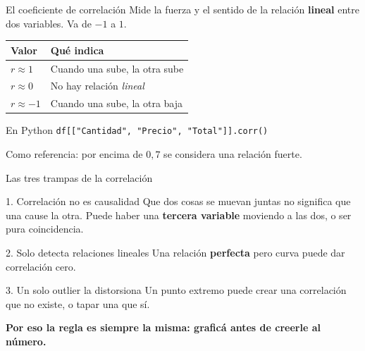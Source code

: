 \documentclass[aspectratio=169,10pt]{beamer}
\begin{document}
\begin{frame}{El coeficiente de correlación}
  Mide la fuerza y el sentido de la relación \textbf{lineal} entre dos variables. Va de $-1$ a $1$.

  \vspace{0.5em}
  \begin{center}
  \begin{tabular}{ll}
    \toprule
    \textbf{Valor} & \textbf{Qué indica} \\
    \midrule
    $r \approx  1$ & Cuando una sube, la otra sube \\
    $r \approx  0$ & No hay relación \emph{lineal} \\
    $r \approx -1$ & Cuando una sube, la otra baja \\
    \bottomrule
  \end{tabular}
  \end{center}

  \vspace{0.5em}
  \begin{exampleblock}{En Python}
    \texttt{df[["Cantidad", "Precio", "Total"]].corr()}
  \end{exampleblock}
  \begin{center}\small Como referencia: por encima de $0{,}7$ se considera una relación fuerte.\end{center}
\end{frame}

\begin{frame}{Las tres trampas de la correlación}
  \begin{block}{1. Correlación no es causalidad}
    Que dos cosas se muevan juntas no significa que una cause la otra. Puede haber una
    \textbf{tercera variable} moviendo a las dos, o ser pura coincidencia.
  \end{block}
  \begin{block}{2. Solo detecta relaciones lineales}
    Una relación \textbf{perfecta} pero curva puede dar correlación cero.
  \end{block}
  \begin{block}{3. Un solo outlier la distorsiona}
    Un punto extremo puede crear una correlación que no existe, o tapar una que sí.
  \end{block}
  \vspace{0.2em}
  \begin{center}
  \textbf{Por eso la regla es siempre la misma: graficá antes de creerle al número.}
  \end{center}
\end{frame}
\end{document}
